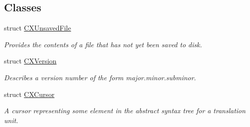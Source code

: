 \subsection*{Classes}
\begin{DoxyCompactItemize}
\item 
struct \hyperlink{structCXUnsavedFile}{C\+X\+Unsaved\+File}
\begin{DoxyCompactList}\small\item\em Provides the contents of a file that has not yet been saved to disk. \end{DoxyCompactList}\item 
struct \hyperlink{structCXVersion}{C\+X\+Version}
\begin{DoxyCompactList}\small\item\em Describes a version number of the form major.\+minor.\+subminor. \end{DoxyCompactList}\item 
struct \hyperlink{structCXCursor}{C\+X\+Cursor}
\begin{DoxyCompactList}\small\item\em A cursor representing some element in the abstract syntax tree for a translation unit. \end{DoxyCompactList}\end{DoxyCompactItemize}
